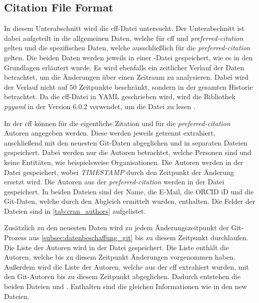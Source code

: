 \subsection{Citation File Format}
\label{subsec:datenbeschaffung_cff}
In diesem Unterabschnitt wird die \gls{cff}-Datei untersucht.
Der Unterabschnitt ist dabei aufgeteilt in die allgemeinen Daten, welche für \gls{cff} und \emph{preferred-citation} gelten und die spezifischen Daten, welche ausschließlich für die \emph{preferred-citation} gelten.
Die beiden Daten werden jeweils in einer -Datei gespeichert, wie es in den Grundlagen erläutert wurde.
Es wird ebenfalls ein zeitlicher Verlauf der Daten betrachtet, um die Änderungen über einen Zeitraum zu analysieren.
Dabei wird der Verlauf nicht auf 50 Zeitpunkte beschränkt, sondern in der gesamten Historie betrachtet.
Da die \gls{cff}-Datei in YAML geschrieben wird, wird die Bibliothek \emph{pyyaml} in der Version 6.0.2 verwendet, um die Datei zu lesen \autocite{simonov_pyyaml_2024}.

In der \gls{cff} können für die eigentliche Zitation und für die \emph{preferred-citation} Autoren angegeben werden.
Diese werden jeweils getrennt extrahiert, anschließend mit den neuesten Git-Daten abgeglichen und in separaten Dateien gespeichert.
Dabei werden nur die Autoren betrachtet, welche Personen sind und keine Entitäten, wie beispielsweise Organisationen.
Die Autoren werden in der Datei  gespeichert, wobei \emph{TIMESTAMP} durch den Zeitpunkt der Änderung ersetzt wird.
Die Autoren aus der \emph{preferred-citation} werden in der Datei  gespeichert.
In beiden Dateien sind der Name, die E-Mail, die ORCID iD und die Git-Daten, welche durch den Abgleich ermittelt wurden, enthalten.
Die Felder der Dateien sind in \autoref{tab:cran_authors} aufgelistet.

Zusätzlich zu den neuesten Daten wird zu jedem Änderungszeitpunkt der Git-Prozess aus \autoref{subsec:datenbeschaffung_git} bis zu diesem Zeitpunkt durchlaufen.
Die Liste der Autoren wird in der Datei  gespeichert.
Die Liste enthält die Autoren, welche bis zu diesem Zeitpunkt Änderungen vorgenommen haben.
Außerdem wird die Liste der Autoren, welche aus der \gls{cff} extrahiert wurden, mit den Git-Autoren bis zu diesem Zeitpunkt abgeglichen.
Dadurch entstehen die beiden Dateien  und .
Enthalten sind die gleichen Informationen wie in den \glqq new\grqq{} Dateien.

